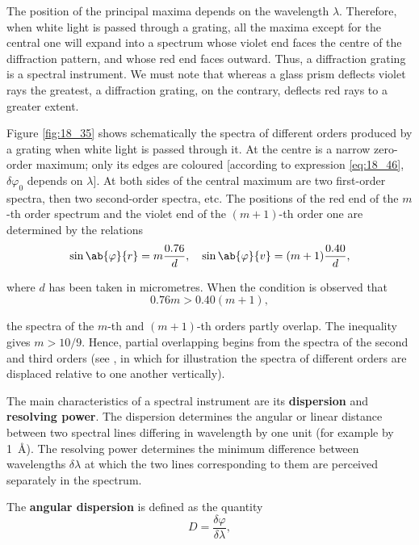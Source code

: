 The position of the principal maxima depends on the wavelength $\lambda$.
Therefore, when white light is passed through a grating, all the maxima except for the central one will expand into a spectrum whose violet end faces the centre of the diffraction pattern, and
whose red end faces outward.
Thus, a diffraction grating is a spectral instrument.
We must note that whereas a glass prism deflects violet rays the greatest, a diffraction grating, on the contrary, deflects red rays to a greater extent.

Figure \ref{fig:18_35} shows schematically the spectra of different orders produced by a grating when white light is passed through it.
At the centre is a narrow zero-order maximum; only its edges are coloured [according to expression \eqref{eq:18_46}, $\delta{\varphi_0}$ depends on $\lambda$].
At both sides of the central maximum are two first-order spectra, then two second-order spectra, etc.
The positions of the red end of the $m$-th order spectrum and the violet end of the $(m+1)$-th order one are determined by the relations
\begin{equation*}
	\sin\ab{\varphi}{r} = m \frac{0.76}{d},\quad \sin\ab{\varphi}{v} = (m+1) \frac{0.40}{d},
\end{equation*}

\noindent
where $d$ has been taken in micrometres.
When the condition is observed that
\begin{equation*}
	0.76 m > 0.40 (m+1),
\end{equation*}

\noindent
the spectra of the $m$-th and $(m+1)$-th orders partly overlap.
The inequality gives $m>10/9$.
Hence, partial overlapping begins from the spectra of the second and third orders (see , in which for illustration the spectra of different orders are displaced relative to one another vertically).

The main characteristics of a spectral instrument are its \textbf{dispersion} and \textbf{resolving power}.
The dispersion determines the angular or linear distance between two spectral lines differing in wavelength by one unit (for example by \SI{1}{\angstrom}).
The resolving power determines the minimum difference between wavelengths $\delta{\lambda}$ at which the two lines corresponding to them are perceived separately in the spectrum.

The \textbf{angular dispersion} is defined as the quantity
\begin{equation}\label{eq:18_49}
	D = \frac{\delta{\varphi}}{\delta{\lambda}},
\end{equation}


